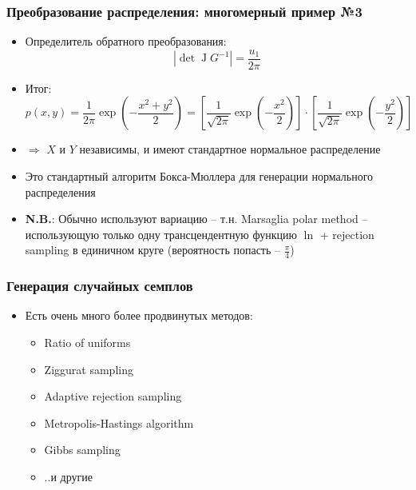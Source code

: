 \documentclass[10pt]{beamer}
\begin{document}
\begin{frame}[fragile]
\frametitle{Преобразование распределения: многомерный пример №3}
\begin{itemize}
\item Определитель обратного преобразования:
\begin{equation*}
|\det \operatorname J G^{-1}| = \frac{u_1}{2 \pi}
\end{equation*}
\pause
\item Итог:
\begin{equation*}
p(x,y) = \frac{1}{2\pi}\exp\left(-\frac{x^2+y^2}{2}\right) = \left[\frac{1}{\sqrt{2\pi}}\exp\left(-\frac{x^2}{2}\right)\right] \cdot \left[\frac{1}{\sqrt{2\pi}}\exp\left(-\frac{y^2}{2}\right)\right]
\end{equation*}
\pause
\item \begin{math}\Longrightarrow\end{math} \begin{math}X\end{math} и \begin{math}Y\end{math} независимы, и имеют стандартное нормальное распределение
\pause
\item Это стандартный алгоритм Бокса-Мюллера для генерации нормального распределения
\pause
\item \alert{\textbf{N.B.}}: Обычно используют вариацию -- т.н. Marsaglia polar method -- использующую только одну трансцендентную функцию \begin{math}\ln\end{math} + rejection sampling в единичном круге (вероятность попасть -- \begin{math}\frac{\pi}{4}\end{math})
\end{itemize}
\end{frame}

\begin{frame}[fragile]
\frametitle{Генерация случайных семплов}
\begin{itemize}
\item Есть очень много более продвинутых методов:
\begin{itemize}
\item Ratio of uniforms
\item Ziggurat sampling
\item Adaptive rejection sampling
\item Metropolis-Hastings algorithm
\item Gibbs sampling
\item ..и другие
\end{itemize}
\end{itemize}
\end{frame}
\end{document}
